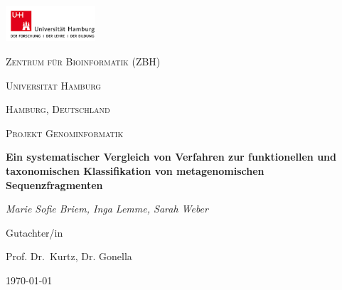 \documentclass[10pt, a4paper]{article}[08.12.2015]
\begin{document}
  \begin{titlepage}
	\centering
	\includegraphics[width=0.25\textwidth]{secondlogo.png}\par\vspace{1cm}
	{\scshape\LARGE Zentrum f\"ur Bioinformatik (ZBH)\par}
	{\scshape\LARGE Universit\"at Hamburg \par}
	{\scshape\LARGE Hamburg, Deutschland \par}
	\vspace{1cm}
	{\scshape\Large Projekt Genominformatik\par}
	\vspace{1.5cm}
	{\huge\bfseries Ein systematischer Vergleich von Verfahren zur 					funktionellen und taxonomischen Klassifikation von metagenomischen 				Sequenzfragmenten\par}
	\vspace{2cm}
	{\Large\itshape Marie Sofie Briem, Inga Lemme, Sarah Weber\par}
	\vfill
	Gutachter/in\par
	Prof. Dr.~Kurtz, Dr. Gonella 

	\vfill

	{\large \today\par}
\end{titlepage}

  \setcounter{page}{2}
  \newpage
  \tableofcontents
  \newpage
  \listoffigures
  \newpage
\end{document}
